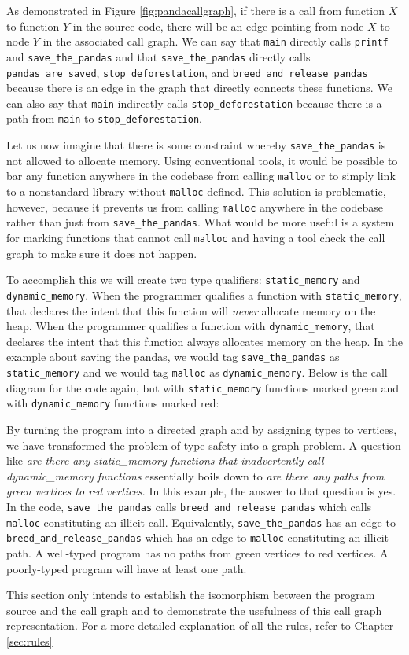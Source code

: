 As demonstrated in Figure \ref{fig:pandacallgraph}, if there is a call from function $X$ to function $Y$ in the source code, there will be an edge pointing from node $X$ to node $Y$ in the associated call graph.  We can say that \lstinline{main} directly calls \lstinline{printf} and \lstinline{save_the_pandas} and that \lstinline{save_the_pandas} directly calls \lstinline{pandas_are_saved}, \lstinline{stop_deforestation}, and \lstinline{breed_and_release_pandas} because there is an edge in the graph that directly connects these functions.  We can also say that \lstinline{main} indirectly calls \lstinline{stop_deforestation} because there is a path from \lstinline{main} to \lstinline{stop_deforestation}.

Let us now imagine that there is some constraint whereby \lstinline{save_the_pandas} is not allowed to allocate memory.  Using conventional tools, it would be possible to bar any function anywhere in the codebase from calling \lstinline{malloc} or to simply link to a nonstandard library without \lstinline{malloc} defined.  This solution is problematic, however, because it prevents us from calling \lstinline{malloc} anywhere in the codebase rather than just from \lstinline{save_the_pandas}.  What would be more useful is a system for marking functions that cannot call \lstinline{malloc} and having a tool check the call graph to make sure it does not happen.  

To accomplish this we will create two type qualifiers:  \lstinline{static_memory} and \lstinline{dynamic_memory}.  When the programmer qualifies a function with \lstinline{static_memory}, that declares the intent that this function will \textit{never} allocate memory on the heap.  When the programmer qualifies a function with \lstinline{dynamic_memory}, that declares the intent that this function always allocates memory on the heap.  In the example about saving the pandas, we would tag \lstinline{save_the_pandas} as \lstinline{static_memory} and we would tag \lstinline{malloc} as \lstinline{dynamic_memory}.  Below is the call diagram for the code again, but with \lstinline{static_memory} functions marked green and with \lstinline{dynamic_memory} functions marked red:



By turning the program into a directed graph and by assigning types to vertices, we have transformed the problem of type safety into a graph problem.  A question like \textit{are there any static\_memory functions that inadvertently call dynamic\_memory functions} essentially boils down to \textit{are there any paths from green vertices to red vertices}.  In this example, the answer to that question is yes.  In the code, \lstinline{save_the_pandas} calls \lstinline{breed_and_release_pandas} which calls \lstinline{malloc} constituting an illicit call.  Equivalently, \lstinline{save_the_pandas} has an edge to \lstinline{breed_and_release_pandas} which has an edge to \lstinline{malloc} constituting an illicit path.  A well-typed program has no paths from green vertices to red vertices.  A poorly-typed program will have at least one path.  

This section only intends to establish the isomorphism between the program source and the call graph and to demonstrate the usefulness of this call graph representation.  For a more detailed explanation of all the rules, refer to Chapter \ref{sec:rules}

